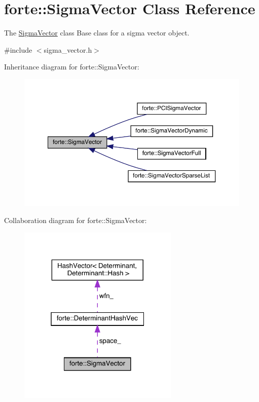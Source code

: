 \hypertarget{classforte_1_1_sigma_vector}{}\section{forte\+:\+:Sigma\+Vector Class Reference}
\label{classforte_1_1_sigma_vector}


The \mbox{\hyperlink{classforte_1_1_sigma_vector}{Sigma\+Vector}} class Base class for a sigma vector object.  




{\ttfamily \#include $<$sigma\+\_\+vector.\+h$>$}



Inheritance diagram for forte\+:\+:Sigma\+Vector\+:
\nopagebreak
\begin{figure}[H]
\begin{center}
\leavevmode
\includegraphics[width=350pt]{classforte_1_1_sigma_vector__inherit__graph}
\end{center}
\end{figure}


Collaboration diagram for forte\+:\+:Sigma\+Vector\+:
\nopagebreak
\begin{figure}[H]
\begin{center}
\leavevmode
\includegraphics[width=217pt]{classforte_1_1_sigma_vector__coll__graph}
\end{center}
\end{figure}
